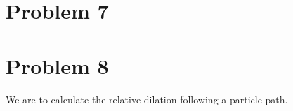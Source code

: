 \documentclass[11pt,a4paper,english]{article}
\numberwithin{equation}{section}
\begin{document}
\section{Problem 7}
\section{Problem 8}
We are to calculate the relative dilation following a particle path.
\end{document}
